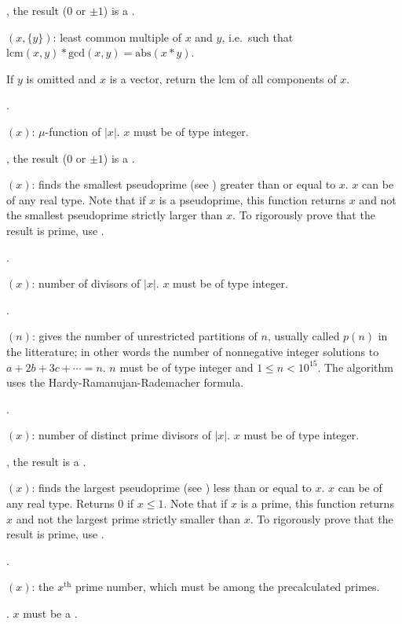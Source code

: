 , the result ($0$ or $\pm 1$) is a .

$(x,\{y\})$: least common multiple of $x$ and $y$, i.e.~such
that $\text{lcm}(x,y)*\text{gcd}(x,y)=\text{abs}(x*y)$.

If $y$ is omitted and $x$ is a vector, return the $\text{lcm}$ of all
components of $x$.

.

$(x)$:  $\mu$-function of $|x|$. $x$ must
be of type integer.

, the result ($0$ or $\pm 1$) is a .

$(x)$: finds the smallest pseudoprime (see
) greater than or equal to $x$. $x$ can be of any real
type. Note that if $x$ is a pseudoprime, this function returns $x$ and not
the smallest pseudoprime strictly larger than $x$. To rigorously prove that
the result is prime, use .

.

$(x)$: number of divisors of $|x|$. $x$ must be of type
integer.

.

$(n)$: gives the number of unrestricted partitions of
$n$, usually called $p(n)$ in the litterature; in other words the number of
nonnegative integer solutions to $a+2b+3c+\cdots=n$. $n$ must be of type
integer and $1\le n<10^{15}$. The algorithm uses the
Hardy-Ramanujan-Rademacher formula.

.

$(x)$: number of distinct prime divisors of $|x|$. $x$
must be of type integer.

, the result is a .

$(x)$: finds the largest pseudoprime (see
) less than or equal to $x$. $x$ can be of any real type.
Returns 0 if $x\le1$. Note that if $x$ is a prime, this function returns $x$
and not the largest prime strictly smaller than $x$. To rigorously prove that
the result is prime, use .

.

$(x)$: the $x^{\text{th}}$ prime number, which must be among
the precalculated primes.

. $x$ must be a .

